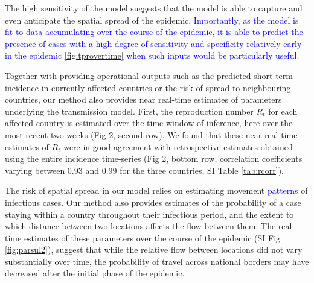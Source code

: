 \documentclass[9pt,twocolumn,twoside,lineno]{pnas-new}
\newcommand{\sangeeta}[1]{\textcolor{blue}{#1}}
\begin{document}

The high sensitivity of the model suggests that the model is able to
capture and even anticipate the spatial spread of the epidemic. 
\sangeeta{ Importantly, as the model is fit to data accumulating over
the course of the epidemic, it is able to predict the presence of
cases with a high degree of sensitivity and specificity relatively 
early in the epidemic \ref{fig:tprovertime} 
when such inputs would be particularly useful.}

Together with providing operational outputs such as the predicted
short-term incidence in currently affected countries or the risk of
spread to neighbouring countries, our method also provides near
real-time estimates of parameters underlying the transmission model.
First, the reproduction number \(R_t\) for each affected country is
estimated over the time-window of inference, here over the most recent
two weeks (Fig 2, second row). We found that these near real-time
estimates of \(R_t\) were in good agreement with retrospective estimates
obtained using the entire incidence time-series (Fig 2, bottom row,
correlation coefficients varying between 0.93 and 0.99 for the three
countries, SI Table \ref{tab:rcorr}).

The risk of spatial spread in our model relies on estimating movement
\sangeeta{patterns} of infectious cases. Our method also provides estimates of
the probability of a case staying within a country throughout their
infectious period, and  the extent to which
distance between two locations affects the flow between them. The
real-time estimates of these parameters over the course of the
epidemic (SI Fig \ref{fig:parsul2}), suggest that while the relative flow
between locations did not vary substantially over time, the probability
of travel across national borders may have decreased after the initial
phase of the epidemic.
\end{document}
